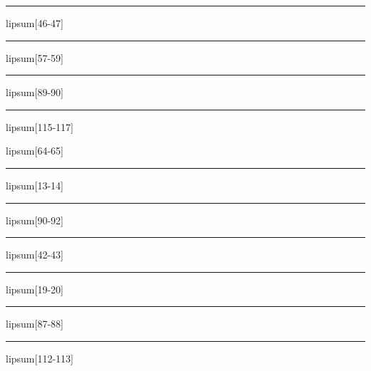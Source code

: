 \documentclass[11pt,a4paper]{article}
\begin{document}
\begin{simplewrap}
  \textcolor{cyan!34}{\rule{3.9cm}{7.5cm}}
\end{simplewrap}
lipsum[46-47]

\begin{simplewrap}
  \textcolor{pink!59}{\rule{5.9cm}{2.3cm}}
\end{simplewrap}
lipsum[57-59]

\begin{simplewrap}
  \textcolor{orange!41}{\rule{3.4cm}{8.0cm}}
\end{simplewrap}
lipsum[89-90]

\begin{simplewrap}
  \textcolor{cyan!50}{\rule{5.7cm}{2.7cm}}
\end{simplewrap}
lipsum[115-117]

lipsum[64-65]

\begin{simplewrap}
  \textcolor{green!32}{\rule{3.8cm}{2.9cm}}
\end{simplewrap}
lipsum[13-14]

\begin{simplewrap}
  \textcolor{olive!20}{\rule{5.7cm}{5.9cm}}
\end{simplewrap}
lipsum[90-92]

\begin{simplewrap}
  \textcolor{orange!40}{\rule{5.4cm}{6.6cm}}
\end{simplewrap}
lipsum[42-43]

\begin{simplewrap}
  \textcolor{blue!28}{\rule{3.1cm}{4.1cm}}
\end{simplewrap}
lipsum[19-20]

\begin{simplewrap}
  \textcolor{pink!20}{\rule{5.2cm}{6.4cm}}
\end{simplewrap}
lipsum[87-88]

\begin{simplewrap}
  \textcolor{red!55}{\rule{3.1cm}{9.5cm}}
\end{simplewrap}
lipsum[112-113]
\end{document}
